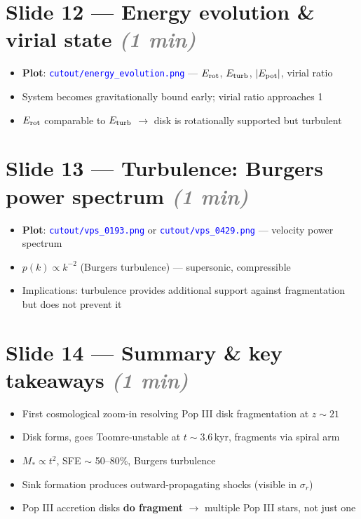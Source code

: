 \documentclass[12pt]{article}
\newcommand{\plotref}[1]{\textcolor{blue}{\texttt{#1}}}
\newcommand{\timing}[1]{\textcolor{gray}{\textit{(#1)}}}
\begin{document}
\section*{Slide 12 --- Energy evolution \& virial state \timing{1 min}}

\begin{itemize}
  \item \textbf{Plot}: \plotref{cutout/energy\_evolution.png} ---
        $E_{\rm rot}$, $E_{\rm turb}$, $|E_{\rm pot}|$, virial ratio
  \item System becomes gravitationally bound early; virial ratio
        approaches 1
  \item $E_{\rm rot}$ comparable to $E_{\rm turb}$ $\to$ disk is
        rotationally supported but turbulent
\end{itemize}

\section*{Slide 13 --- Turbulence: Burgers power spectrum \timing{1 min}}

\begin{itemize}
  \item \textbf{Plot}: \plotref{cutout/vps\_0193.png} or
        \plotref{cutout/vps\_0429.png} --- velocity power spectrum
  \item $p(k) \propto k^{-2}$ (Burgers turbulence) --- supersonic,
        compressible
  \item Implications: turbulence provides additional support against
        fragmentation but does not prevent it
\end{itemize}

\section*{Slide 14 --- Summary \& key takeaways \timing{1 min}}

\begin{itemize}
  \item First cosmological zoom-in resolving Pop III disk fragmentation
        at $z \sim 21$
  \item Disk forms, goes Toomre-unstable at $t \sim 3.6$\,kyr,
        fragments via spiral arm
  \item $M_* \propto t^2$, SFE $\sim$ 50--80\%, Burgers turbulence
  \item Sink formation produces outward-propagating shocks (visible in
        $\sigma_r$)
  \item Pop III accretion disks \textbf{do fragment} $\to$ multiple
        Pop III stars, not just one
\end{itemize}
\end{document}
